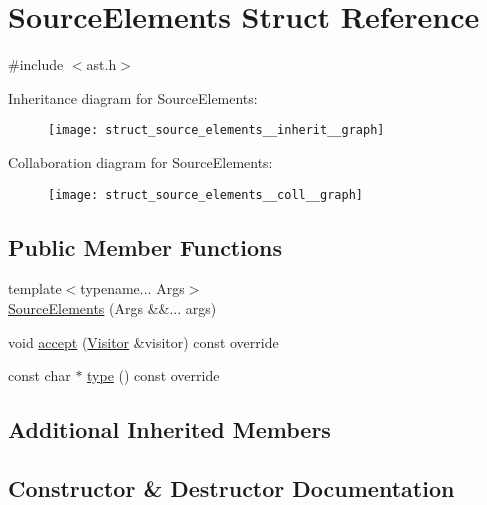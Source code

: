 \hypertarget{struct_source_elements}{}\section{Source\+Elements Struct Reference}
\label{struct_source_elements}


{\ttfamily \#include $<$ast.\+h$>$}



Inheritance diagram for Source\+Elements\+:
\nopagebreak
\begin{figure}[H]
\begin{center}
\leavevmode
\texttt{[image: struct\_source\_elements\_\_inherit\_\_graph]}
\end{center}
\end{figure}


Collaboration diagram for Source\+Elements\+:
\nopagebreak
\begin{figure}[H]
\begin{center}
\leavevmode
\texttt{[image: struct\_source\_elements\_\_coll\_\_graph]}
\end{center}
\end{figure}
\subsection*{Public Member Functions}
\begin{DoxyCompactItemize}
\item 
{\footnotesize template$<$typename... Args$>$ }\\\hyperlink{struct_source_elements_a1f7065c95d241407e691f198c8dd9b19}{Source\+Elements} (Args \&\&... args)
\item 
void \hyperlink{struct_source_elements_af5c2f1b3c9a9961f4d76734953a4fdf5}{accept} (\hyperlink{struct_visitor}{Visitor} \&visitor) const override
\item 
const char $\ast$ \hyperlink{struct_source_elements_a2e6131a995ee5d7e0c8e7a440827245d}{type} () const override
\end{DoxyCompactItemize}
\subsection*{Additional Inherited Members}


\subsection{Constructor \& Destructor Documentation}
\mbox{\label{struct_source_elements_a1f7065c95d241407e691f198c8dd9b19}} 
